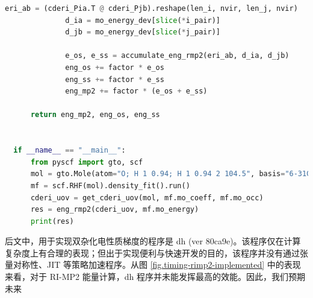 \begin{lstlisting}[language=Python]
              eri_ab = (cderi_Pia.T @ cderi_Pjb).reshape(len_i, nvir, len_j, nvir)
              d_ia = mo_energy_dev[slice(*i_pair)]
              d_jb = mo_energy_dev[slice(*j_pair)]
  
              e_os, e_ss = accumulate_eng_rmp2(eri_ab, d_ia, d_jb)
              eng_os += factor * e_os
              eng_ss += factor * e_ss
              eng_mp2 += factor * (e_os + e_ss)
      
      return eng_mp2, eng_os, eng_ss
  
  
  if __name__ == "__main__":
      from pyscf import gto, scf
      mol = gto.Mole(atom="O; H 1 0.94; H 1 0.94 2 104.5", basis="6-31G").build()
      mf = scf.RHF(mol).density_fit().run()
      cderi_uov = get_cderi_uov(mol, mf.mo_coeff, mf.mo_occ)
      res = eng_rmp2(cderi_uov, mf.mo_energy)
      print(res)  
\end{lstlisting}

\newpage








后文中，用于实现双杂化电性质梯度的程序是 dh (ver 80ca9e)。该程序仅在计算复杂度上有合理的表现；但出于实现便利与快速开发的目的，该程序并没有通过张量对称性、JIT 等策略加速程序。从图 \ref{fig.timing-rimp2-implemented} 中的表现来看，对于 RI-MP2 能量计算，dh 程序并未能发挥最高的效能。因此，我们预期未来




